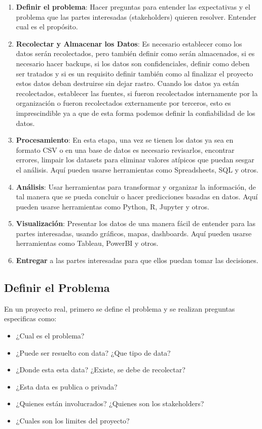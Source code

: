 \documentclass[12pt,a4paper,openright]{article}
\begin{document}
\begin{enumerate}
    \item \textbf{Definir el problema}: Hacer preguntas para entender las expectativas y el problema que las partes interesadas (stakeholders) quieren resolver. Entender cual es el propósito.
    \item \textbf{Recolectar y Almacenar los Datos}: Es necesario establecer como los datos serán recolectados, pero también definir como serán almacenados, si es necesario hacer backups, si los datos son confidenciales, definir como deben ser tratados y si es un requisito definir también como al finalizar el proyecto estos datos deban destruirse sin dejar rastro. Cuando los datos ya están recolectados, establecer las fuentes, si fueron recolectados internamente por la organización o fueron recolectados externamente por terceros, esto es imprescindible ya a que de esta forma podemos definir la confiabilidad de los datos. 
    \item \textbf{Procesamiento}: En esta etapa, una vez se tienen los datos ya sea en formato CSV o en una base de datos es necesario revisarlos, encontrar errores, limpair los datasets para eliminar valores atípicos que puedan sesgar el análisis. Aquí pueden usarse herramientas como Spreadsheets, SQL y otros.
    \item \textbf{An\'alisis}: Usar herramientas para transformar y organizar la información, de tal manera que se pueda concluir o hacer predicciones basadas en datos. Aquí pueden usarse herramientas como Python, R, Jupyter y otros.
    \item \textbf{Visualización}: Presentar los datos de una manera fácil de entender para las partes interesadas, usando gráficos, mapas, dashboards. Aquí pueden usarse herramientas como Tableau, PowerBI y otros.
    \item \textbf{Entregar} a las partes interesadas para que ellos puedan tomar las decisiones.
\end{enumerate}





\subsection{Definir el Problema}
En un proyecto real, primero se define el problema y se realizan preguntas especificas como:
\begin{itemize}
    \item ¿Cual es el problema?
    \item ¿Puede ser resuelto con data? ¿Que tipo de data?
    \item ¿Donde esta esta data? ¿Existe, se debe de recolectar?
    \item ¿Esta data es publica o privada?
    \item ¿Quienes están involucrados? ¿Quienes son los stakeholders?
    \item ¿Cuales son los limites del proyecto?
\end{itemize}
\end{document}
